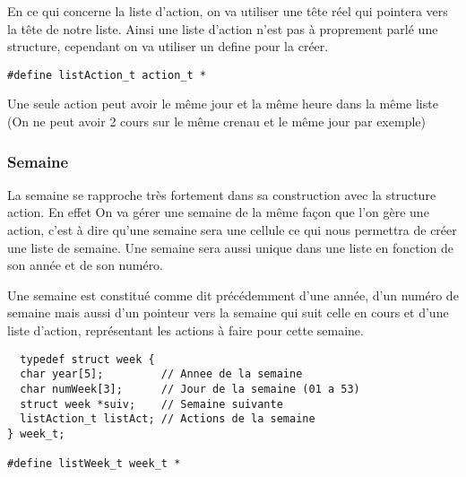 \documentclass[11pt]{article}
\begin{document}
En ce qui concerne la liste d'action, on va utiliser une tête réel qui pointera
vers la tête de notre liste. Ainsi une liste d'action n'est pas à proprement
parlé une structure, cependant on va utiliser un define pour la créer.

\begin{lstlisting}
#define listAction_t action_t *
\end{lstlisting}

Une seule action peut avoir le même jour et la même heure dans la même liste (On ne
peut avoir 2 cours sur le même crenau et le même jour par exemple)


\subsubsection{Semaine}
\label{sec:orgeccc87f}

La semaine se rapproche très fortement dans sa construction avec la
structure action. En effet On va gérer une semaine de la même façon que l'on
gère une action, c'est à dire qu'une semaine sera une cellule ce qui nous
permettra de créer une liste de semaine. Une semaine sera aussi unique dans
une liste en fonction de son année et de son numéro.

Une semaine est constitué comme dit précédemment d'une année, d'un numéro de
semaine mais aussi d'un pointeur vers la semaine qui suit celle en cours et
d'une liste d'action, représentant les actions à faire pour cette semaine.

\begin{lstlisting}
  typedef struct week {
  char year[5];         // Annee de la semaine
  char numWeek[3];      // Jour de la semaine (01 a 53)
  struct week *suiv;    // Semaine suivante
  listAction_t listAct; // Actions de la semaine
} week_t;

#define listWeek_t week_t *
\end{lstlisting}
\end{document}

